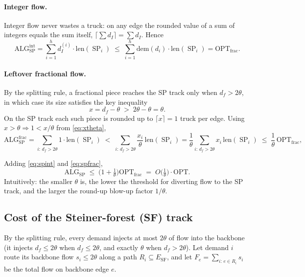 \documentclass[11pt]{article}
\theoremstyle{definition}
\theoremstyle{remark}
\newcommand{\OPT}{\mathrm{OPT}}
\newcommand{\OPTfrac}{\OPT_{\mathrm{frac}}}
\newcommand{\ALG}{\mathrm{ALG}}
\newcommand{\ALGSP}{\ALG_{\mathrm{SP}}}
\newcommand{\ESF}{E_{\mathrm{SF}}}
\newcommand{\dem}{\mathrm{dem}}
\newcommand{\len}{\mathrm{len}}
\DeclareMathOperator{\SP}{SP}
\begin{document}
\paragraph{Integer flow.} Integer flow never wastes a truck: on any edge the rounded value of a sum
of integers equals the sum itself, $\lceil\sum d_I\rceil=\sum d_I$. Hence
\begin{equation}\label{eq:spint}
  \ALGSP^{\mathrm{int}}=\sum_{i=1}^{h} d_I^{(i)}\cdot\len(\SP_i)
  \;\le\;\sum_{i=1}^{h}\dem(d_i)\cdot\len(\SP_i)=\OPTfrac .
\end{equation}

\paragraph{Leftover fractional flow.} By the splitting rule, a fractional piece reaches the SP track
only when $d_f>2\theta$, in which case its size satisfies the key inequality
\begin{equation}\label{eq:xtheta}
  x=d_f-\theta \;>\; 2\theta-\theta=\theta .
\end{equation}
On the SP track each such piece is rounded up to $\lceil x\rceil=1$ truck per edge. Using
$x>\theta\Rightarrow 1<x/\theta$ from \eqref{eq:xtheta},
\begin{equation}\label{eq:spfrac}
  \ALGSP^{\mathrm{frac}}
  =\sum_{i:\,d_f>2\theta} 1\cdot\len(\SP_i)
  \;<\;\sum_{i:\,d_f>2\theta}\frac{x_i}{\theta}\,\len(\SP_i)
  =\frac1\theta\sum_{i:\,d_f>2\theta} x_i\,\len(\SP_i)
  \;\le\;\frac1\theta\,\OPTfrac ,
\end{equation}

Adding \eqref{eq:spint} and \eqref{eq:spfrac},
\begin{equation}\label{eq:sp}
  \boxed{\;\ALGSP \;\le\; \Big(1+\tfrac1\theta\Big)\OPTfrac
  \;=\; O\!\Big(\tfrac1\theta\Big)\cdot\OPT.\;}
\end{equation}
Intuitively: the smaller $\theta$ is, the lower the threshold for diverting flow to the SP track, and
the larger the round-up blow-up factor $1/\theta$.

\subsection{Cost of the Steiner-forest (SF) track}

By the splitting rule, every demand injects at most $2\theta$ of flow into the backbone (it injects
$d_f\le 2\theta$ when $d_f\le 2\theta$, and exactly $\theta$ when $d_f>2\theta$). Let demand $i$ route
its backbone flow $s_i\le 2\theta$ along a path $R_i\subseteq\ESF$, and let $F_e=\sum_{i:\,e\in R_i}s_i$
be the total flow on backbone edge $e$.
\end{document}
